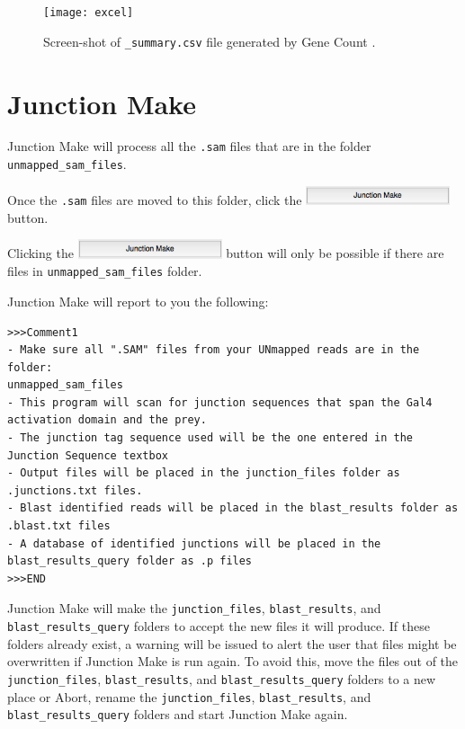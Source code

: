 \documentclass[11pt,fleqn]{book} %
\newcommand{\GeneCount}{{\color{Red} Gene Count }}
\newcommand{\JunctionMake}{{\color{Blue} Junction Make }}
\begin{document}
\begin{figure}[!ht]
    \centering
    \texttt{[image: excel]}
    \caption{Screen-shot of \texttt{\_summary.csv} file generated by \GeneCount.}
    \label{fig:excel_screen_shot}
\end{figure}



\chapter{\JunctionMake}

\JunctionMake will process all the \texttt{.sam} files that are in the folder \texttt{unmapped\_sam\_files}.

\vspace{15pt}

Once the \texttt{.sam} files are moved to this folder, click the \includegraphics[width=120pt]{Pictures/junction_make_btn} button.

\begin{remark}
Clicking the \includegraphics[width=120pt]{Pictures/junction_make_btn} button will only be possible if there are files in \texttt{unmapped\_sam\_files} folder.
\end{remark}


\JunctionMake will report to you the following:

\begin{lstlisting}
>>>Comment1
- Make sure all ".SAM" files from your UNmapped reads are in the folder:
unmapped_sam_files
- This program will scan for junction sequences that span the Gal4 activation domain and the prey.
- The junction tag sequence used will be the one entered in the Junction Sequence textbox
- Output files will be placed in the junction_files folder as .junctions.txt files. 
- Blast identified reads will be placed in the blast_results folder as .blast.txt files
- A database of identified junctions will be placed in the blast_results_query folder as .p files
>>>END
\end{lstlisting}



\JunctionMake  will make the \texttt{junction\_files}, \texttt{blast\_results}, and \texttt{blast\_results\_query} folders to accept the new files it will produce. If these folders already exist, a warning will be issued to alert the user that files might be overwritten if \JunctionMake is run again. To avoid this, move the files out of the \texttt{junction\_files}, \texttt{blast\_results}, and \texttt{blast\_results\_query} folders to a new place or Abort, rename the \texttt{junction\_files}, \texttt{blast\_results}, and \texttt{blast\_results\_query} folders and start \JunctionMake again.
\end{document}
